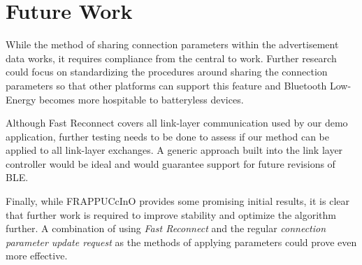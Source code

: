 \chapter{Future Work}
\label{chp:futurework}

While the method of sharing connection parameters within the advertisement data works, it requires compliance from the central to work. Further research could focus on standardizing the procedures around sharing the connection parameters so that other platforms can support this feature and Bluetooth Low-Energy becomes more hospitable to batteryless devices.

Although Fast Reconnect covers all link-layer communication used by our demo application, further testing needs to be done to assess if our method can be applied to all link-layer exchanges. A generic approach built into the link layer controller would be ideal and would guarantee support for future revisions of BLE.

Finally, while FRAPPUCcInO provides some promising initial results, it is clear that further work is required to improve stability and optimize the algorithm further. A combination of using \textit{Fast Reconnect} and the regular \textit{connection parameter update request} as the methods of applying parameters could prove even more effective.